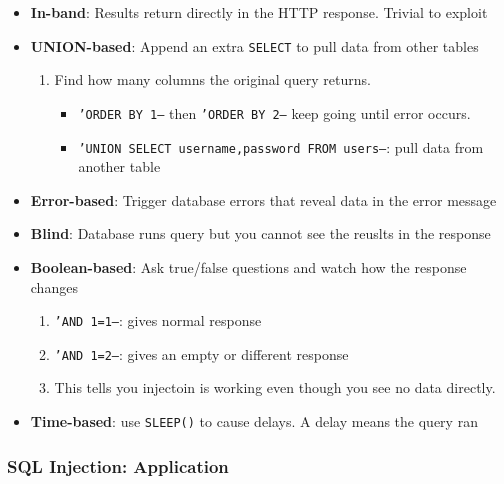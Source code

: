 \documentclass[12pt, letterpaper]{article}
\begin{document}
\begin{itemize}
    \item \textbf{In-band}: Results return directly in the HTTP response. Trivial to exploit
    \item \textbf{UNION-based}: Append an extra \texttt{SELECT} to pull data from other tables
        \begin{enumerate}
            \item Find how many columns the original query returns.
                \begin{itemize}
                    \item \texttt{'ORDER BY 1--} then \texttt{'ORDER BY 2--} keep going until error occurs.
                    \item \texttt{'UNION SELECT username,password FROM users--}: pull data from another table
                \end{itemize}
        \end{enumerate}
    \item \textbf{Error-based}: Trigger database errors that reveal data in the error message
    \item \textbf{Blind}: Database runs query but you cannot see the reuslts in the response
    \item \textbf{Boolean-based}: Ask true/false questions and watch how the response changes
        \begin{enumerate}
            \item \texttt{'AND 1=1--}: gives normal response
            \item \texttt{'AND 1=2--}: gives an empty or different response
            \item This tells you injectoin is working even though you see no data directly.
        \end{enumerate}
    \item \textbf{Time-based}: use \texttt{SLEEP()} to cause delays. A delay means the query ran
\end{itemize}

\subsubsection*{SQL Injection: Application}
\end{document}
